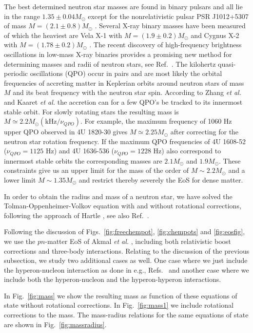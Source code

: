 The best determined neutron star masses are found in binary pulsars
and all lie in the range $1.35\pm 0.04 M_\odot$ \cite{tc99}
except for the nonrelativistic pulsar PSR J1012+5307
of mass
$M=(2.1\pm 0.8)M_\odot$ \cite{vanParadijs1998}. Several X-ray binary
masses have been measured of which the heaviest are
Vela X-1 with $M=(1.9\pm 0.2)M_\odot$ \cite{Barziv1999}
and Cygnus X-2 with
$M=(1.78\pm 0.2)M_\odot$ \cite{OroszKuulkers1999}.  The recent
discovery of high-frequency brightness oscillations in low-mass X-ray
binaries provides a promising new method for determining masses and
radii of neutron stars, see Ref.\ \cite{miller99}. The
kilohertz quasi-periodic oscillations (QPO) occur in pairs
and are most likely the orbital
frequencies of accreting matter
in Keplerian orbits around neutron stars of mass $M$ and its beat
frequency with the neutron star spin.  According to
Zhang {\em et al.} \cite{zhang98} and   Kaaret {\em et al.}
\cite{kaaret1998} the accretion
can for a few QPO's be tracked to its innermost stable orbit.
For slowly rotating stars the resulting mass is
$M\simeq2.2M_\odot({\mathrm{kHz}}/\nu_{QPO})$.  For example, the
maximum frequency of 1060 Hz upper QPO observed in 4U 1820-30 gives 
$M\simeq 2.25M_\odot$ after correcting for the neutron star
rotation frequency.  If the maximum QPO frequencies of 4U 1608-52
($\nu_{QPO}=1125$ Hz) and 4U 1636-536 ($\nu_{QPO}=1228$ Hz) also
correspond to innermost stable orbits the corresponding masses are
$2.1M_\odot$ and $1.9M_\odot$. 
These constraints give us an upper limit for the mass of the order
of  $M\sim 2.2 M_\odot$ and a lower limit $M\sim 1.35 M_\odot$ and 
restrict thereby severely the EoS for dense matter.

In order to obtain the radius and mass of a neutron star, we have solved
the Tolman-Oppenheimer-Volkov equation with and without
rotational corrections, following the approach of Hartle \cite{hartle1967},
see also Ref.\ \cite{hh99}.

Following the discussion of Figs.~\ref{fig:freechempot}, 
\ref{fig:chempots} and \ref{fig:eosfig}, we use the 
$pn$-matter EoS of Akmal {\em et al.} \cite{apr98},
including both relativistic boost corrections and
three-body interactions. 
Relating to the discussion of the previous subsection, we study
two additional cases as well. One case 
where we just include the hyperon-nucleon
interaction as done in e.g., Refs.~\cite{bbs00} and another case
where we include both the hyperon-nucleon and the hyperon-hyperon
interactions.

In Fig.\ \ref{fig:mass} we show the resulting mass as function
of these equations of state without rotational 
corrections. In Fig.~\ref{fig:mass1} 
we include rotational corrections to the mass. The mass-radius relations
for the same equations of state are shown in
Fig.~\ref{fig:massradius}.

